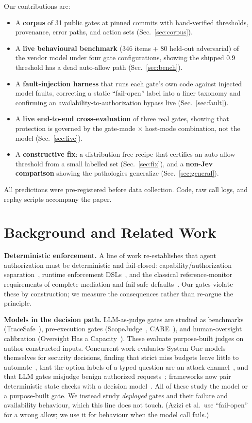 \documentclass[conference]{IEEEtran}
\begin{document}
Our contributions are:
\begin{itemize}
\item A \textbf{corpus} of 31 public gates at pinned commits with hand-verified thresholds,
provenance, error paths, and action sets (Sec.~\ref{sec:corpus}).
\item A \textbf{live behavioural benchmark} (346 items + 80 held-out adversarial) of the
vendor model under four gate configurations, showing the shipped $0.9$ threshold has a dead
auto-allow path (Sec.~\ref{sec:bench}).
\item A \textbf{fault-injection harness} that runs each gate's own code against injected
model faults, correcting a static ``fail-open'' label into a finer taxonomy and confirming
an availability-to-authorization bypass live (Sec.~\ref{sec:fault}).
\item A \textbf{live end-to-end cross-evaluation} of three real gates, showing that
protection is governed by the gate-mode $\times$ host-mode combination, not the model
(Sec.~\ref{sec:live}).
\item A \textbf{constructive fix}: a distribution-free recipe that certifies an auto-allow
threshold from a small labelled set (Sec.~\ref{sec:fix}), and a \textbf{non-Jev comparison}
showing the pathologies generalize (Sec.~\ref{sec:general}).
\end{itemize}
All predictions were pre-registered before data collection. Code, raw call logs, and replay
scripts accompany the paper.

\section{Background and Related Work}
\textbf{Deterministic enforcement.} A line of work re-establishes that agent authorization
must be deterministic and fail-closed: capability/authorization separation~\cite{scopegate2026},
runtime enforcement DSLs~\cite{agentspec2026}, and the classical reference-monitor
requirements of complete mediation and fail-safe defaults~\cite{saltzer1975}. Our gates
violate these by construction; we measure the consequences rather than re-argue the
principle.

\textbf{Models in the decision path.} LLM-as-judge gates are studied as benchmarks
(TraceSafe~\cite{tracesafe2026}), pre-execution gates (ScopeJudge~\cite{scopejudge2026},
CARE~\cite{care2026}), and human-oversight calibration
(Oversight Has a Capacity~\cite{oversight2026}). These evaluate purpose-built judges on
author-constructed inputs. Concurrent work evaluates System One models themselves for
security decisions, finding that strict miss budgets leave little to
automate~\cite{liu2026systemone}, that the option labels of a typed question are an attack
channel~\cite{azizi2026option}, and that LLM gates misjudge benign authorized
requests~\cite{authgatebench2026}; frameworks now pair deterministic state checks with a
decision model~\cite{jevact2026}. All of these study the model or a purpose-built gate. We
instead study \emph{deployed} gates and their failure and availability behaviour, which this
line does not touch. (Azizi et al.\ use ``fail-open'' for a wrong allow; we use it for
behaviour when the model call fails.)
\end{document}
